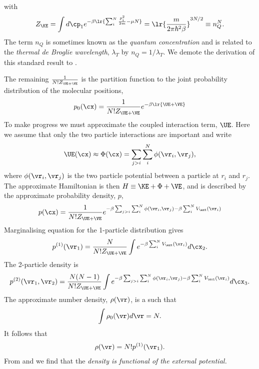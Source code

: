 {{with 
\begin{align}
  Z_\KE = \int d \cp_1 e^{-\beta \lr{\sum_i^N \frac{p_i^2}{2m}-\mu N}} = \lr{\frac{m}{2\pi\hbar^2 \beta}}^{3N/2} \equiv n_Q^N.
\end{align}
The term $n_Q$ is sometimes known as the {\em quantum concentration} and is related to the {\em thermal de Broglie wavelength}, $\lambda_T$ by $n_Q = 1/\lambda_T$.
We demote the derivation of this standard result  to .
\item
  The remaining $\frac{1}{N! Z_{\UE+\VE}}$ is the  partition function to the joint probability distribution of the  molecular positions,
  \begin{align}
    p_0(\cx) = \frac{1}{N!Z_{\UE+\VE} } e^{-\beta\lr{\UE+\VE}}
  \end{align}
  To make progress  we must  approximate the coupled interaction term, $\UE$.
Here we assume that only the two particle interactions are important
and write
\begin{align}
  \UE(\cx) \approx \Phi(\cx) =  \sum_{j>i} \sum_i^N \phi(\vr_i, \vr_j),
\end{align}
where $\phi(\vr_i, \vr_j)$ is the two particle potential between a particle at $r_i$ and $r_j$.
%
The approximate Hamiltonian is then $H \equiv \KE + \Phi + \VE$,
and is described by the approximate  probability density, $p$,
  \begin{align}
    p(\cx) = \frac{1}{N!Z_{\UE+\VE} } e^{-\beta\sum_{j>i} \sum_i^N \phi(\vr_i, \vr_j) -\beta\sum_i^N V_\ext(\vr_i)} \label{eqn:pspatial}
  \end{align}
  Marginalising equation  for the  1-particle distribution gives
  \begin{align}
    p^{(1)}(\vr_1) = \frac{N}{N! Z_{\UE+\VE}} \int e^{-\beta\sum_i^N V_\ext(\vr_i)} d\cx_2. \label{eqn:ponespatial}
  \end{align}
  The 2-particle density is 
  \begin{align}
    p^{(2)}(\vr_1, \vr_2) = \frac{N(N-1)}{N!Z_{\UE+\VE}}\int e^{-\beta\sum_{j>i} \sum_i^N \phi(\vr_i, \vr_j)-\beta\sum_i^N V_\ext(\vr_i)} d\cx_3.
  \end{align}
  The approximate number density, $\rho(\vr)$, is a such that
  \begin{align}
    \int \rho_0(\vr) d\vr = N .
  \end{align}
  It follows that
  \begin{align}
    \rho(\vr) = N!  p^{(1)}(\vr_1). \label{eqn:rhoone}
  \end{align}
  From  and  we find that the {\em density is functional of the external potential.}
}

}
